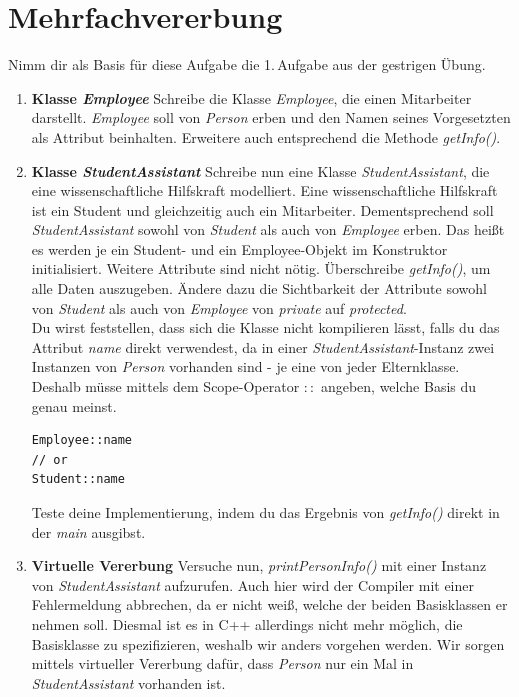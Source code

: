 

\newcommand{\tag}{4}

\cppSetTitle


	
\cppSetHeaderAndMakeTitle 	

\vspace{5mm}

\section{Mehrfachvererbung}
Nimm dir als Basis für diese Aufgabe die 1.\,Aufgabe aus der gestrigen Übung.

\begin{enumerate}
\item \textbf{Klasse \emph{Employee}}
Schreibe die Klasse \emph{Employee}, die einen Mitarbeiter darstellt.
\emph{Employee} soll von \emph{Person} erben und den Namen seines Vorgesetzten als Attribut beinhalten.
Erweitere auch entsprechend die Methode \emph{getInfo()}.

\item \textbf{Klasse \emph{StudentAssistant}}
Schreibe nun eine Klasse \emph{StudentAssistant}, die eine wissenschaftliche Hilfskraft modelliert.
Eine wissenschaftliche Hilfskraft ist ein Student und gleichzeitig auch ein Mitarbeiter.
Dementsprechend soll \emph{StudentAssistant} sowohl von \emph{Student} als auch von \emph{Employee} erben. Das heißt es werden je ein Student- und ein Employee-Objekt im Konstruktor initialisiert.
Weitere Attribute sind nicht nötig.
Überschreibe \emph{getInfo()}, um alle Daten auszugeben.
Ändere dazu die Sichtbarkeit der Attribute sowohl von \emph{Student} als auch von \emph{Employee} von \emph{private} auf \emph{protected}. \\

Du wirst feststellen, dass sich die Klasse nicht kompilieren lässt, falls du das Attribut \emph{name} direkt verwendest, da in einer \emph{StudentAssistant}-Instanz zwei Instanzen von \emph{Person} vorhanden sind - je eine von jeder Elternklasse. Deshalb müsse mittels dem Scope-Operator $::$ angeben, welche Basis du genau meinst.
\begin{lstlisting}
Employee::name
// or
Student::name
\end{lstlisting}

Teste deine Implementierung, indem du das Ergebnis von \emph{getInfo()} direkt in der \emph{main} ausgibst.

\item \textbf{Virtuelle Vererbung}
Versuche nun, \emph{printPersonInfo()} mit einer Instanz von \emph{StudentAssistant} aufzurufen. Auch hier wird der Compiler mit einer Fehlermeldung abbrechen, da er nicht weiß, welche der beiden Basisklassen er nehmen soll.
Diesmal ist es in C++ allerdings nicht mehr möglich, die Basisklasse zu spezifizieren, weshalb wir anders vorgehen werden.
Wir sorgen mittels virtueller Vererbung dafür, dass \emph{Person} nur ein Mal in \emph{StudentAssistant} vorhanden ist.


\end{enumerate}
